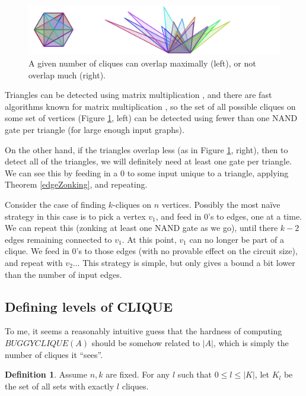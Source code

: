 \documentclass[12pt]{article}
\theoremstyle{definition}
\newtheorem{defn}{Definition}[section]
\begin{document}
\begin{figure}
\centering
\includegraphics[width=1\textwidth]{R/tri1.pdf}
\caption{A given number of cliques can overlap maximally (left),
or not overlap much (right).}
\label{fig:overlappingTriangles}
\end{figure}

Triangles can be detected using matrix multiplication \cite{itai_finding_1977},
and there are fast algorithms known for matrix multiplication
\cite{strassen_gaussian_1969}
\cite{williams_multiplying_2012}, so the set of all possible
cliques on some set of vertices (Figure \ref{fig:overlappingTriangles}, left)
 can be detected
using fewer than one NAND gate per triangle (for large enough input graphs).

On the other hand, if the triangles overlap less (as in
Figure \ref{fig:overlappingTriangles}, right),
then to detect all of the triangles, we will definitely need at least one
gate per triangle. We can see this by feeding in a 0 to some input
unique to a triangle, applying Theorem \ref{edgeZonking}, and repeating.

Consider the case of finding $k$-cliques on $n$ vertices.
Possibly the most na\"ive strategy in this case is to pick a vertex $v_1$,
and feed in 0's to edges, one at a time. We can repeat this
(zonking at least one NAND gate as we go), until there
$k-2$ edges remaining connected to $v_1$. At this point, $v_1$ can no
longer be part of a clique. We feed in 0's to those edges (with no
provable effect on the circuit size), and repeat with $v_2$...
This strategy is simple, but only gives a bound a bit lower than
the number of input edges.

\subsection{Defining levels of CLIQUE}

To me, it seems a reasonably intuitive guess that the hardness of
computing $BUGGYCLIQUE(A)$ should be somehow related to
$|A|$, which is simply the number of cliques it ``sees''.

\begin{defn}
\label{CLIQUE-level}
Assume $n, k$ are fixed. For any $l$ such that
$0 \le l \le |K|$, let $K_l$ be the set of all sets
with exactly $l$ cliques. 
\end{defn}
\end{document}
